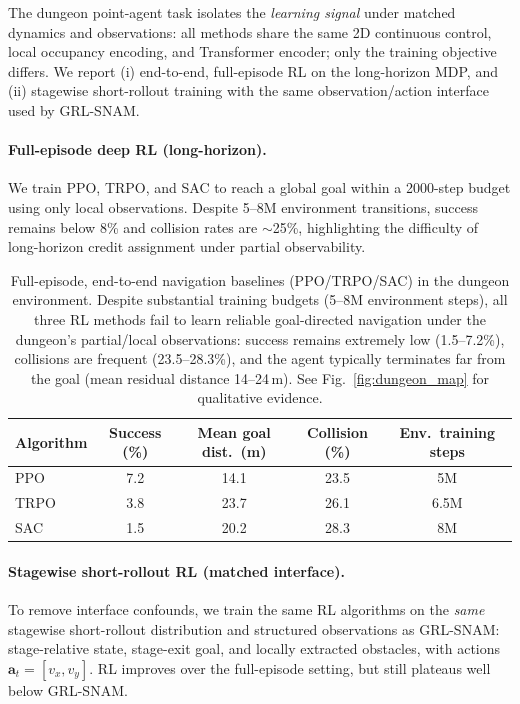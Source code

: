 \documentclass{article} %
\begin{document}
The dungeon point-agent task isolates the \emph{learning signal} under matched dynamics and observations: all methods share the same 2D continuous control, local occupancy encoding, and Transformer encoder; only the training objective differs.
We report (i) end-to-end, full-episode RL on the long-horizon MDP, and (ii) stagewise short-rollout training with the same observation/action interface used by GRL-SNAM.

\paragraph{Full-episode deep RL (long-horizon).}
We train PPO, TRPO, and SAC to reach a global goal within a 2000-step budget using only local observations.
Despite 5--8M environment transitions, success remains below 8\% and collision rates are $\sim$25\%, highlighting the difficulty of long-horizon credit assignment under partial observability.

\begin{table}[htbp]
\centering
\caption[Full-episode end-to-end RL baselines in the dungeon]{
Full-episode, end-to-end navigation baselines (PPO/TRPO/SAC) in the dungeon environment.
Despite substantial training budgets (5--8M environment steps), all three RL methods
fail to learn reliable goal-directed navigation under the dungeon’s partial/local observations:
success remains extremely low (1.5--7.2\%), collisions are frequent (23.5--28.3\%), and the
agent typically terminates far from the goal (mean residual distance 14--24\,m).
See Fig.~\ref{fig:dungeon_map} for qualitative evidence.%
}
\label{tab:full_episode_rl}
\small
\begin{tabular}{lcccc}
\toprule
Algorithm & Success (\%) & Mean goal dist.\ (m) & Collision (\%) & Env.\ training steps \\
\midrule
PPO  & 7.2 & 14.1 & 23.5 & 5M \\
TRPO & 3.8 & 23.7 & 26.1 & 6.5M \\
SAC  & 1.5 & 20.2 & 28.3 & 8M \\
\bottomrule
\end{tabular}
\end{table}

\paragraph{Stagewise short-rollout RL (matched interface).}
To remove interface confounds, we train the same RL algorithms on the \emph{same} stagewise short-rollout distribution and structured observations as GRL-SNAM: stage-relative state, stage-exit goal, and locally extracted obstacles, with actions $\mathbf{a}_t=[v_x,v_y]$.
RL improves over the full-episode setting, but still plateaus well below GRL-SNAM.
\end{document}
